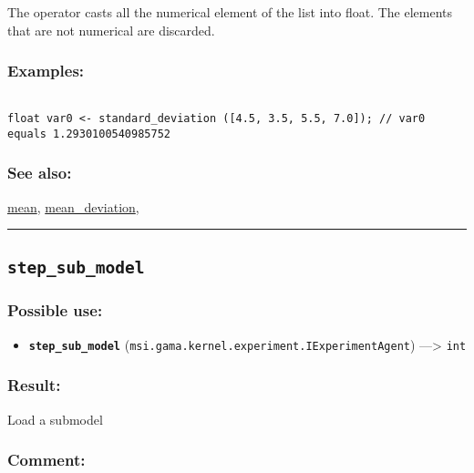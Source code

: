 \documentclass[]{book}
\providecommand{\tightlist}{%
  \setlength{\itemsep}{0pt}\setlength{\parskip}{0pt}}
\theoremstyle{definition}
\theoremstyle{definition}
\theoremstyle{definition}
\theoremstyle{remark}
\begin{document}
The operator casts all the numerical element of the list into float. The
elements that are not numerical are discarded.

\subsubsection{Examples:}\label{examples-350}

\begin{verbatim}
 
float var0 <- standard_deviation ([4.5, 3.5, 5.5, 7.0]); // var0 equals 1.2930100540985752
\end{verbatim}

\subsubsection{See also:}\label{see-also-197}

\href{OperatorsIM\#mean}{mean},
\href{OperatorsIM\#mean_deviation}{mean\_deviation},

\begin{center}\rule{0.5\linewidth}{\linethickness}\end{center}

\subsection{\texorpdfstring{\texttt{step\_sub\_model}}{step\_sub\_model}}\label{step_sub_model}

\subsubsection{Possible use:}\label{possible-use-503}

\begin{itemize}
\tightlist
\item
  \textbf{\texttt{step\_sub\_model}}
  (\texttt{msi.gama.kernel.experiment.IExperimentAgent})
  ---\textgreater{} \texttt{int}
\end{itemize}

\subsubsection{Result:}\label{result-486}

Load a submodel

\subsubsection{Comment:}\label{comment-95}
\end{document}
